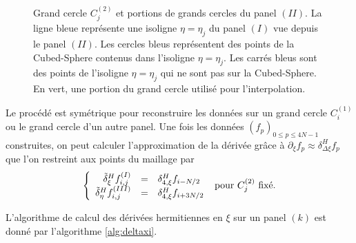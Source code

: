 \begin{figure}[htbp]
\begin{center}
\end{center}
\caption{Grand cercle $C_j^{(2)}$ et portions de grands cercles du panel $(II)$. La ligne bleue représente une isoligne $\eta=\eta_j$ du panel $(I)$ vue depuis le panel $(II)$. Les cercles bleus représentent des points de la Cubed-Sphere contenus dans l'isoligne $\eta=\eta_j$. Les carrés bleus sont des points de l'isoligne $\eta=\eta_j$ qui ne sont pas sur la Cubed-Sphere. En vert, une portion du grand cercle utilisé pour l'interpolation.}
\label{fig: panel II_interp2}
\end{figure}  

Le procédé est symétrique pour reconstruire les données sur un grand cercle $C_i^{(1)}$ ou le grand cercle d'un autre panel.
Une fois les données $(f_p)_{0 \leq p \leq 4N-1}$ construites, on peut calculer l'approximation de la dérivée grâce à $\partial_{\xi} f_p \approx \delta_{\Delta \xi}^H f_p$
que l'on restreint aux points du maillage par 
\begin{equation}
\left\lbrace
\begin{array}{rcl}
\tilde{\delta}^H_{\xi} f_{i,j}^{(I)} & = & \delta_{4, \xi}^H f_{i-N/2}\\
\tilde{\delta}^H_{\eta} f_{i,j}^{(III)} & = & \delta_{4, \xi}^H f_{i+3N/2}
\end{array}
\right.
\text{ pour } C^{(2)}_j \text{ fixé.}
\end{equation}

L'algorithme de calcul des dérivées hermitiennes en $\xi$ sur un panel $(k)$ est donné par l'algorithme \ref{alg:deltaxi}.

